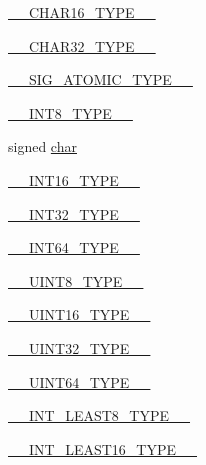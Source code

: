 \begin{DoxyCompactItemize}
\item 
\hyperlink{cmake-build-release_2CMakeCache_8txt_a7e380349dd3aa6cea0d744c2e90e4721}{\+\_\+\+\_\+\+C\+H\+A\+R16\+\_\+\+T\+Y\+P\+E\+\_\+\+\_\+}
\item 
\hyperlink{cmake-build-release_2CMakeCache_8txt_af91b17fdb800ffc733b2eddf51172eac}{\+\_\+\+\_\+\+C\+H\+A\+R32\+\_\+\+T\+Y\+P\+E\+\_\+\+\_\+}
\item 
\hyperlink{cmake-build-release_2CMakeCache_8txt_a2c74d832cde290cb39ee58eda6214a78}{\+\_\+\+\_\+\+S\+I\+G\+\_\+\+A\+T\+O\+M\+I\+C\+\_\+\+T\+Y\+P\+E\+\_\+\+\_\+}
\item 
\hyperlink{cmake-build-release_2CMakeCache_8txt_a7068c995e5075e4589201a350d1cefca}{\+\_\+\+\_\+\+I\+N\+T8\+\_\+\+T\+Y\+P\+E\+\_\+\+\_\+}
\item 
signed \hyperlink{cmake-build-release_2CMakeCache_8txt_afe71f11dacb15682cdc012f7208e6e09}{char}
\item 
\hyperlink{cmake-build-release_2CMakeCache_8txt_aecf40d0b02f3ea9194acecf92ef8ad0b}{\+\_\+\+\_\+\+I\+N\+T16\+\_\+\+T\+Y\+P\+E\+\_\+\+\_\+}
\item 
\hyperlink{cmake-build-release_2CMakeCache_8txt_aff307c0fcea6eefb5eead1fd6d9b8153}{\+\_\+\+\_\+\+I\+N\+T32\+\_\+\+T\+Y\+P\+E\+\_\+\+\_\+}
\item 
\hyperlink{cmake-build-release_2CMakeCache_8txt_aa68c5513d779cc8e92de1fb1e99a1451}{\+\_\+\+\_\+\+I\+N\+T64\+\_\+\+T\+Y\+P\+E\+\_\+\+\_\+}
\item 
\hyperlink{cmake-build-release_2CMakeCache_8txt_acdac745c75cc6d9467f0e8f428cb7c38}{\+\_\+\+\_\+\+U\+I\+N\+T8\+\_\+\+T\+Y\+P\+E\+\_\+\+\_\+}
\item 
\hyperlink{cmake-build-release_2CMakeCache_8txt_a7c334ef15565439f16847268e5aecc00}{\+\_\+\+\_\+\+U\+I\+N\+T16\+\_\+\+T\+Y\+P\+E\+\_\+\+\_\+}
\item 
\hyperlink{cmake-build-release_2CMakeCache_8txt_ae5f84304c1e72cdd73b6da53c4d47f25}{\+\_\+\+\_\+\+U\+I\+N\+T32\+\_\+\+T\+Y\+P\+E\+\_\+\+\_\+}
\item 
\hyperlink{cmake-build-release_2CMakeCache_8txt_ae5334e804b67b171a886cb9c2a6241f0}{\+\_\+\+\_\+\+U\+I\+N\+T64\+\_\+\+T\+Y\+P\+E\+\_\+\+\_\+}
\item 
\hyperlink{cmake-build-release_2CMakeCache_8txt_a0f059754211c536004913c4594b226b7}{\+\_\+\+\_\+\+I\+N\+T\+\_\+\+L\+E\+A\+S\+T8\+\_\+\+T\+Y\+P\+E\+\_\+\+\_\+}
\item 
\hyperlink{cmake-build-release_2CMakeCache_8txt_a6841cc391d897d17cd36b6389eedf1a9}{\+\_\+\+\_\+\+I\+N\+T\+\_\+\+L\+E\+A\+S\+T16\+\_\+\+T\+Y\+P\+E\+\_\+\+\_\+}

\end{DoxyCompactItemize}
